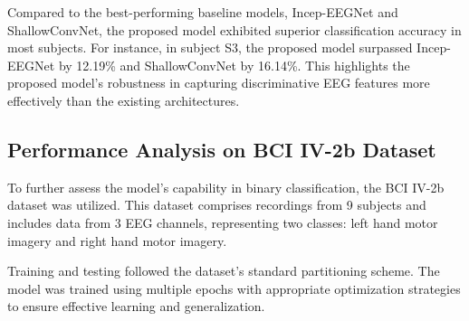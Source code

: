 \documentclass[pdflatex,sn-mathphys-num]{sn-jnl}%
\theoremstyle{thmstyleone}%
\theoremstyle{thmstyletwo}%
\theoremstyle{thmstylethree}%
\begin{document}
Compared to the best-performing baseline models, Incep-EEGNet and ShallowConvNet, the proposed model exhibited superior classification accuracy in most subjects. For instance, in subject S3, the proposed model surpassed Incep-EEGNet by 12.19\% and ShallowConvNet by 16.14\%. This highlights the proposed model’s robustness in capturing discriminative EEG features more effectively than the existing architectures.

\subsection{Performance Analysis on BCI IV-2b Dataset}
To further assess the model's capability in binary classification, the BCI IV-2b dataset was utilized. This dataset comprises recordings from 9 subjects and includes data from 3 EEG channels, representing two classes: left hand motor imagery and right hand motor imagery.

Training and testing followed the dataset's standard partitioning scheme. The model was trained using multiple epochs with appropriate optimization strategies to ensure effective learning and generalization.
\begin{table*}[htbp]
\centering
\caption{Classification accuracy (\%) on the BCI IV-2b dataset. Bold values indicate the highest accuracy per subject.}
\label{tab:BCI_IV_2b}
\end{table*}
\end{document}
